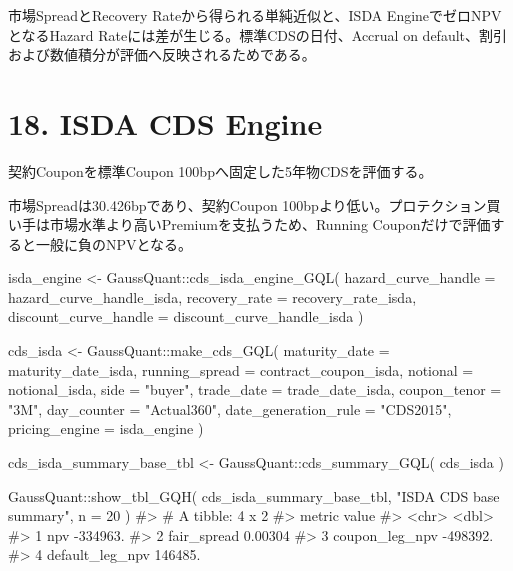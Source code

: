 \documentclass[
  letterpaper,
  DIV=11,
  numbers=noendperiod]{scrreprt}
\newenvironment{Shaded}{\begin{snugshade}}{\end{snugshade}}
\newcommand{\AttributeTok}[1]{\textcolor[rgb]{0.40,0.45,0.13}{#1}}
\newcommand{\CommentTok}[1]{\textcolor[rgb]{0.37,0.37,0.37}{#1}}
\newcommand{\DecValTok}[1]{\textcolor[rgb]{0.68,0.00,0.00}{#1}}
\newcommand{\FunctionTok}[1]{\textcolor[rgb]{0.28,0.35,0.67}{#1}}
\newcommand{\NormalTok}[1]{\textcolor[rgb]{0.00,0.23,0.31}{#1}}
\newcommand{\OtherTok}[1]{\textcolor[rgb]{0.00,0.23,0.31}{#1}}
\newcommand{\SpecialCharTok}[1]{\textcolor[rgb]{0.37,0.37,0.37}{#1}}
\newcommand{\StringTok}[1]{\textcolor[rgb]{0.13,0.47,0.30}{#1}}
\begin{document}
市場SpreadとRecovery Rateから得られる単純近似と、ISDA
EngineでゼロNPVとなるHazard Rateには差が生じる。標準CDSの日付、Accrual
on default、割引および数値積分が評価へ反映されるためである。

\section{18. ISDA CDS Engine}\label{isda-cds-engine}

契約Couponを標準Coupon 100bpへ固定した5年物CDSを評価する。

市場Spreadは30.426bpであり、契約Coupon
100bpより低い。プロテクション買い手は市場水準より高いPremiumを支払うため、Running
Couponだけで評価すると一般に負のNPVとなる。

\begin{Shaded}
\begin{Highlighting}[]
\NormalTok{isda\_engine }\OtherTok{\textless{}{-}}\NormalTok{ GaussQuant}\SpecialCharTok{::}\FunctionTok{cds\_isda\_engine\_GQL}\NormalTok{(}
  \AttributeTok{hazard\_curve\_handle =}\NormalTok{ hazard\_curve\_handle\_isda,}
  \AttributeTok{recovery\_rate =}\NormalTok{ recovery\_rate\_isda,}
  \AttributeTok{discount\_curve\_handle =}\NormalTok{ discount\_curve\_handle\_isda}
\NormalTok{)}

\NormalTok{cds\_isda }\OtherTok{\textless{}{-}}\NormalTok{ GaussQuant}\SpecialCharTok{::}\FunctionTok{make\_cds\_GQL}\NormalTok{(}
  \AttributeTok{maturity\_date =}\NormalTok{ maturity\_date\_isda,}
  \AttributeTok{running\_spread =}\NormalTok{ contract\_coupon\_isda,}
  \AttributeTok{notional =}\NormalTok{ notional\_isda,}
  \AttributeTok{side =} \StringTok{"buyer"}\NormalTok{,}
  \AttributeTok{trade\_date =}\NormalTok{ trade\_date\_isda,}
  \AttributeTok{coupon\_tenor =} \StringTok{"3M"}\NormalTok{,}
  \AttributeTok{day\_counter =} \StringTok{"Actual360"}\NormalTok{,}
  \AttributeTok{date\_generation\_rule =} \StringTok{"CDS2015"}\NormalTok{,}
  \AttributeTok{pricing\_engine =}\NormalTok{ isda\_engine}
\NormalTok{)}

\NormalTok{cds\_isda\_summary\_base\_tbl }\OtherTok{\textless{}{-}}\NormalTok{ GaussQuant}\SpecialCharTok{::}\FunctionTok{cds\_summary\_GQL}\NormalTok{(}
\NormalTok{  cds\_isda}
\NormalTok{)}

\NormalTok{GaussQuant}\SpecialCharTok{::}\FunctionTok{show\_tbl\_GQH}\NormalTok{(}
\NormalTok{  cds\_isda\_summary\_base\_tbl,}
  \StringTok{"ISDA CDS base summary"}\NormalTok{,}
  \AttributeTok{n =} \DecValTok{20}
\NormalTok{)}
\CommentTok{\#\textgreater{} \# A tibble: 4 x 2}
\CommentTok{\#\textgreater{}   metric                  value}
\CommentTok{\#\textgreater{}   \textless{}chr\textgreater{}                   \textless{}dbl\textgreater{}}
\CommentTok{\#\textgreater{} 1 npv             {-}334963.     }
\CommentTok{\#\textgreater{} 2 fair\_spread           0.00304}
\CommentTok{\#\textgreater{} 3 coupon\_leg\_npv  {-}498392.     }
\CommentTok{\#\textgreater{} 4 default\_leg\_npv  146485.}
\end{Highlighting}
\end{Shaded}
\end{document}
